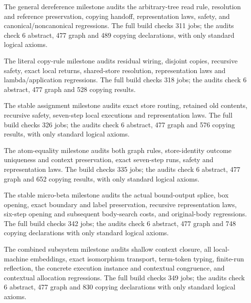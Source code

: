 The general dereference milestone audits the arbitrary-tree read rule,
resolution and reference preservation, copying handoff, representation laws,
safety, and canonical/noncanonical regressions. The full build checks 311 jobs;
the audits check 6 abstract, 477 graph and 489 copying declarations, with only
standard logical axioms.

The literal copy-rule milestone audits residual wiring, disjoint copies,
recursive safety, exact local returns, shared-store resolution, representation
laws and lambda/application regressions. The full build checks 318 jobs;
the audits check 6 abstract, 477 graph and 528 copying results.

The stable assignment milestone audits exact store routing, retained old
contents, recursive safety, seven-step local executions and representation
laws. The full build checks 326 jobs; the audits check 6 abstract, 477 graph
and 576 copying results, with only standard logical axioms.

The atom-equality milestone audits both graph rules, store-identity outcome
uniqueness and context preservation, exact seven-step runs, safety and
representation laws. The build checks 335 jobs; the audits check 6 abstract,
477 graph and 652 copying results, with only standard logical axioms.


The stable micro-beta milestone audits the actual bound-output splice, box
opening, exact boundary and label preservation, recursive representation
laws, six-step opening and subsequent body-search costs, and original-body
regressions. The full build checks 342 jobs; the audits check 6 abstract,
477 graph and 748 copying declarations with only standard logical axioms.


The combined subsystem milestone audits shallow context closure, all local-machine
embeddings, exact isomorphism transport, term-token typing, finite-run reflection,
the concrete execution instance and contextual congruence, and contextual
allocation regressions. The full build checks 349 jobs; the audits check
6 abstract, 477 graph and 830 copying declarations with only standard logical axioms.


